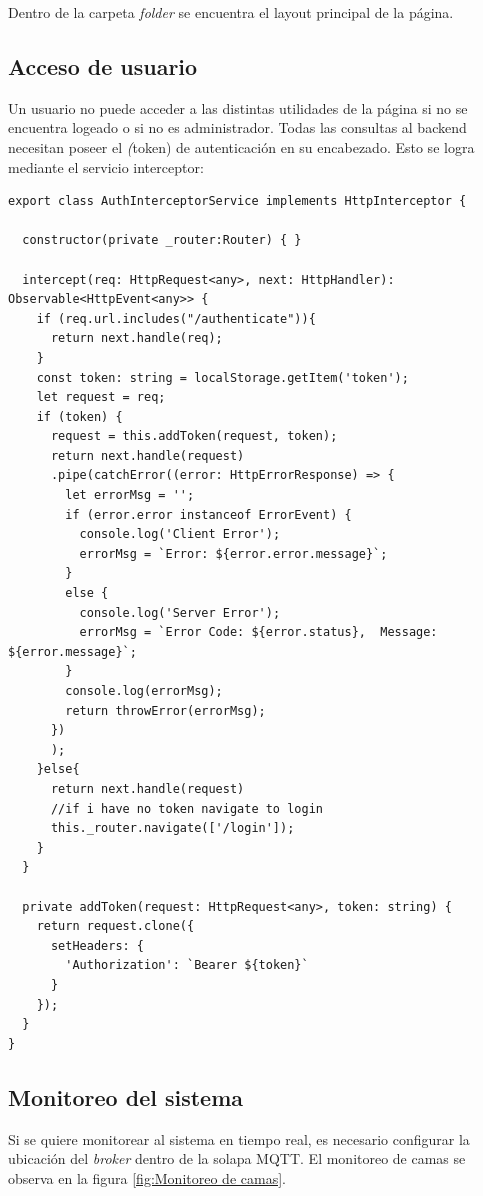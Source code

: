 Dentro de la carpeta \textit{folder} se encuentra el layout principal de la página.




\subsection{Acceso de usuario}

Un usuario no puede acceder a las distintas utilidades de la página si no se encuentra logeado o si no es administrador. Todas las consultas al backend necesitan poseer el \textit(token) de autenticación en su encabezado. Esto se logra mediante el servicio interceptor:


\begin{lstlisting}[caption=  Inserción de token]
export class AuthInterceptorService implements HttpInterceptor {

  constructor(private _router:Router) { }

  intercept(req: HttpRequest<any>, next: HttpHandler): Observable<HttpEvent<any>> {
    if (req.url.includes("/authenticate")){
      return next.handle(req);
    }
    const token: string = localStorage.getItem('token');
    let request = req;
	if (token) {
      request = this.addToken(request, token);
      return next.handle(request)
      .pipe(catchError((error: HttpErrorResponse) => {
        let errorMsg = '';
        if (error.error instanceof ErrorEvent) {
          console.log('Client Error');
          errorMsg = `Error: ${error.error.message}`;
        }
        else {
          console.log('Server Error');
          errorMsg = `Error Code: ${error.status},  Message: ${error.message}`;
        }
        console.log(errorMsg);
        return throwError(errorMsg);
      })
      );
    }else{
      return next.handle(request)
      //if i have no token navigate to login
      this._router.navigate(['/login']);
    }    
  }

  private addToken(request: HttpRequest<any>, token: string) {
    return request.clone({
      setHeaders: {
        'Authorization': `Bearer ${token}`
      }
    });
  }
}

\end{lstlisting}

\subsection{Monitoreo del sistema}
Si se quiere monitorear al sistema en tiempo real, es necesario configurar la ubicación del \textit{broker} dentro de la solapa MQTT. El monitoreo de camas se observa en la figura \ref{fig:Monitoreo de camas}.

